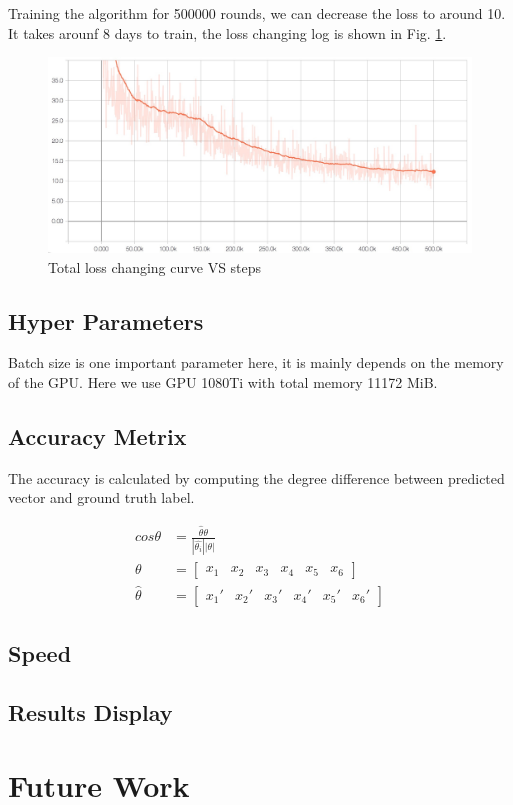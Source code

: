 \documentclass[senior]{IPSstyle}
\begin{document}
Training the algorithm for 500000 rounds, we can decrease the loss to around 10.
It takes arounf 8 days to train, the loss changing log is shown in Fig. \ref{fig:loss}.
\begin{figure}
    \centering
    \includegraphics[width=15cm]{MasterThesis-master/images/loss.jpg}
    \caption{Total loss changing curve VS steps}
    \label{fig:loss}
\end{figure}

\section{Hyper Parameters}
Batch size is one important parameter here, it is mainly depends on the memory of the GPU.
Here we use GPU 1080Ti with total memory 11172 MiB.

\section{Accuracy Metrix}
The accuracy is calculated by computing the degree difference between predicted vector and ground truth label.

\begin{equation}\label{accuracy}
\begin{split}
    cos\theta & = \frac{\hat{\theta}\theta}{|\hat{\theta_i}||\theta|} \\
        \theta      & = \begin{bmatrix} x_1 &x_2 &x_3 & x_4 &x_5 &x_6 \end{bmatrix}  \\
        \hat{\theta} & = \begin{bmatrix} {x_1}' &{x_2}' &{x_3}' & {x_4}' &{x_5}' &{x_6}' \end{bmatrix} 
\end{split}
\end{equation}

\section{Speed}
\section{Results Display}


\chapter{Future Work}\label{future work}
% 


\end{document}
